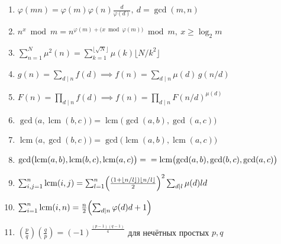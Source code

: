 \begin{enumerate}
где $a'$ и $b'$ — обратные: $aa'\equiv1\pmod b,\; bb'\equiv1\pmod a$

\item %
$\varphi(mn)=\varphi(m)\varphi(n)\frac{d}{\varphi(d)},\  d=\gcd(m,n)$

\item %
$n^x\bmod m = n^{\varphi(m)+\bigl(x\bmod\varphi(m)\bigr)}\bmod m,\ x\ge\log_2 m$

\item %
$\sum_{n=1}^N\mu^2(n)=\sum_{k=1}^{\lfloor\sqrt N\rfloor}\mu(k)\bigl\lfloor N/k^2\bigr\rfloor$

\item %
$g(n)=\sum_{d\mid n}f(d) \implies f(n)=\sum_{d\mid n}\mu(d)\,g(n/d)$

\item %
$F(n)=\prod_{d\mid n}f(d) \implies f(n)=\prod_{d\mid n}F(n/d)^{\mu(d)}$

\item %
$\gcd\bigl(a,\operatorname{lcm}(b,c)\bigr)=\operatorname{lcm}\bigl(\gcd(a,b),\gcd(a,c)\bigr)$

\item %
$\operatorname{lcm}\bigl(a,\gcd(b,c)\bigr)=\gcd\bigl(\operatorname{lcm}(a,b),\operatorname{lcm}(a,c)\bigr)$

\item %
$\gcd\bigl(\operatorname{lcm}(a,b),\operatorname{lcm}(b,c),\operatorname{lcm}(a,c)\bigr)
 =\\= \operatorname{lcm}\bigl(\gcd(a,b),\gcd(b,c),\gcd(a,c)\bigr)$

\item %
$\sum_{i,j=1}^n\operatorname{lcm}(i,j)
=\sum_{l=1}^n\Bigl(\frac{(1+\lfloor n/l\rfloor)\lfloor n/l\rfloor}{2}\Bigr)^2\sum_{d\mid l}\mu(d)ld$

\item %
$\sum_{i=1}^n\operatorname{lcm}(i,n)=\frac{n}{2}\Bigl(\sum_{d\mid n}\varphi(d)d+1\Bigr)$

\item %
$\left(\tfrac{p}{q}\right)\left(\tfrac{q}{p}\right)=(-1)^{\frac{(p-1)(q-1)}{4}}$
 для нечётных простых $p,q$


\end{enumerate}
